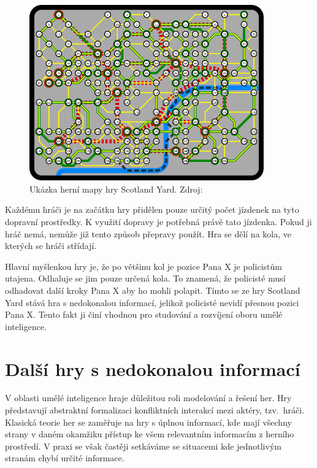 \begin{figure}[H]
	\centering
	\includegraphics[width=0.9\textwidth]{obrazky-figures/scotland_original}
	\caption{Ukázka herní mapy hry Scotland Yard.
  Zdroj:\cite{scotland_original_image}}\label{fig:figure}
\end{figure}

Každému hráči je na začátku hry přidělen pouze určitý počet jízdenek na tyto dopravní prostředky.
K využití dopravy je potřebná právě tato jízdenka.
Pokud ji hráč nemá, nemůže již tento způsob přepravy použít.
Hra se dělí na kola, ve kterých se hráči střídají.

Hlavní myšlenkou hry je, že po většinu kol je pozice Pana X je policistům utajena.
Odhaluje se jim pouze určená kola.
To znamená, že policisté musí odhadovat další kroky Pana X aby ho mohli polapit.
Tímto se ze hry Scotland Yard stává hra s nedokonalou informací, jelikož policisté nevidí přesnou pozici Pana X\@.
Tento fakt ji činí vhodnou pro studování a rozvíjení oboru umělé inteligence.



\section{Další hry s nedokonalou informací}\label{sec:dalsi-hry-s-nedokonalou-informaci}
V oblasti umělé inteligence hraje důležitou roli modelování a řešení her.
Hry představují abstraktní formalizaci konfliktních interakcí mezi aktéry, tzv.~hráči.
Klasická teorie her se zaměřuje na hry s úplnou informací, kde mají všechny strany v daném okamžiku přístup ke všem relevantním informacím z herního prostředí.
V praxi se však častěji setkáváme se situacemi kde jednotlivým stranám chybí určité informace.


